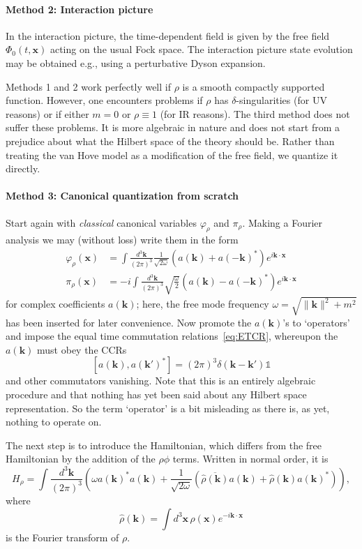 \documentclass[12pt,a4paper]{article}
\newcommand{\1}{\mathds{1}}                         %
\newcommand{\kb}{{\boldsymbol{k}}}
\newcommand{\xb}{{\boldsymbol{x}}}
\begin{document}
	\paragraph{Method 2: Interaction picture} In the interaction picture, the time-dependent
	field is given by the free field $\Phi_0(t,\xb)$ acting on the usual Fock space. The interaction picture state evolution may be obtained e.g., using a perturbative Dyson expansion.	
	
	Methods 1 and 2 work perfectly well if $\rho$ is a smooth compactly supported function. However, one encounters problems if $\rho$ has $\delta$-singularities (for UV reasons) or if either $m=0$ or $\rho\equiv 1$ (for IR reasons). The third method does not suffer these problems. It is more algebraic in nature and does not start from a prejudice about what the Hilbert space of the theory should be. Rather than treating the van Hove model as a modification of the free field, we quantize it directly.  
	
	\paragraph{Method 3: Canonical quantization from scratch} Start again
	with \emph{classical} canonical variables $\varphi_\rho$ and $\pi_\rho$. Making a Fourier analysis we may (without loss) write them in the form
	\begin{align*}
	\varphi_\rho(\xb) &= \int\frac{d^3\kb}{(2\pi)^3}\frac{1}{\sqrt{2\omega}}
	(a(\kb) + a(-\kb)^*)e^{i\kb\cdot\xb}\\
	\pi_\rho(\xb) &= -i\int\frac{d^3\kb}{(2\pi)^3}\sqrt{\frac{\omega}{2}}
	(a(\kb) - a(-\kb)^*)e^{i\kb\cdot\xb}
	\end{align*} 
	for complex coefficients $a(\kb)$; here, the free mode frequency $\omega=\sqrt{\|\kb\|^2+m^2}$ has been inserted for later convenience.
	Now promote the $a(\kb)$'s to `operators' and impose the equal time commutation relations~\eqref{eq:ETCR}, whereupon the $a(\kb)$ must obey the CCRs
	\begin{equation}\label{eq:aCCRs}
	[a(\kb),a(\kb')^*]=(2\pi)^3\delta(\kb-\kb')\mathbb{1}
	\end{equation}
	and other commutators vanishing. Note that this is an entirely algebraic procedure and that nothing has yet been said about any Hilbert space representation. So the term `operator' is a bit misleading as there is, as yet, nothing to operate on.  
	
	The next step is to introduce the Hamiltonian, which differs from the free Hamiltonian by the addition of the $\rho\phi$ terms. Written 
	in normal order, it is 
	\begin{equation}\label{eq:HvH}
	H_\rho=\int\frac{d^3\kb}{(2\pi)^3} \left(\omega a(\kb)^*a(\kb) +\frac{1}{\sqrt{2\omega}}\left(\overline{\hat{\rho}(\kb)}a(\kb) + \hat{\rho}(\kb)a(\kb)^*\right) \right) ,
	\end{equation} 
	where 
	\begin{equation}
	\hat{\rho}(\kb)=\int d^3\xb\, \rho(\xb)e^{-i\kb\cdot\xb}
	\end{equation} 
	is the Fourier transform of $\rho$.
	
\end{document}
